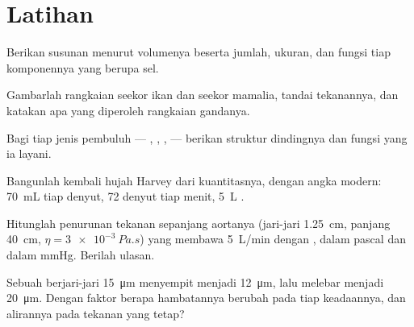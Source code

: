 \section{Latihan}

\begin{exercise}[$\star$]\label{exo:b2:blood-circulation:1}
Berikan susunan  menurut volumenya beserta jumlah, ukuran, dan
fungsi tiap komponennya yang berupa sel.
\end{exercise}

\begin{exercise}[$\star$]\label{exo:b2:blood-circulation:2}
Gambarlah rangkaian seekor ikan dan seekor mamalia, tandai tekanannya,
dan katakan apa yang diperoleh rangkaian gandanya.
\end{exercise}

\begin{exercise}[$\star$]\label{exo:b2:blood-circulation:3}
Bagi tiap jenis pembuluh --- , , ,  ---
berikan struktur dindingnya dan fungsi yang ia layani.
\end{exercise}

\begin{exercise}[$\star$]\label{exo:b2:blood-circulation:4}
Bangunlah kembali hujah Harvey dari kuantitasnya, dengan angka modern:
\qty{70}{mL} tiap denyut, \num{72} denyut tiap menit, \qty{5}{L} .
\end{exercise}

\begin{exercise}[$\star\star$]\label{exo:b2:blood-circulation:5}
Hitunglah penurunan tekanan sepanjang aortanya (jari-jari
\qty{1.25}{cm}, panjang \qty{40}{cm}, $\eta = \qty{3e-3}{Pa.s}$) yang
membawa \qty{5}{L/min} dengan , dalam pascal dan dalam mmHg. Berilah ulasan.
\end{exercise}

\begin{exercise}[$\star\star$]\label{exo:b2:blood-circulation:6}
Sebuah  berjari-jari \qty{15}{\micro m} menyempit menjadi
\qty{12}{\micro m}, lalu melebar menjadi \qty{20}{\micro m}. Dengan
faktor berapa hambatannya berubah pada tiap keadaannya, dan alirannya
pada tekanan yang tetap?
\end{exercise}

